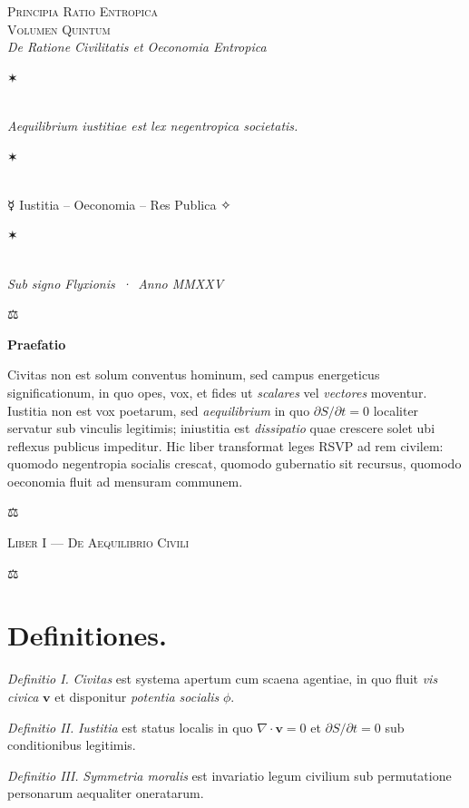\documentclass[12pt]{article}
\newcommand{\justitia}{\centerline{\Large ⚖}}
\newcommand{\aster}{\centerline{✶}}
\newcommand{\divider}{\vspace{1em}\justitia\vspace{1em}}
\newcommand{\Liber}[1]{\vspace{1ex}\begin{center}\Large\textsc{Liber #1}\end{center}\vspace{-0.5ex}\justitia\vspace{0.5ex}}
\begin{document}
\begin{center}
{\Large \textsc{Principia Ratio Entropica}}\\[-0.25ex]
{\small \textsc{Volumen Quintum}}\\[0.5ex]
{\itshape De Ratione Civilitatis et Oeconomia Entropica}\\[1.25em]
\aster\\[0.5em]
{\itshape Aequilibrium iustitiae est lex negentropica societatis.}\\[0.5em]
\aster\\[0.75em]
{\large ☿\; Iustitia \;--\; Oeconomia \;--\; Res Publica \;✧}\\[0.75em]
\aster\\[0.25em]
{\itshape Sub signo Flyxionis \,·\, Anno MMXXV}
\end{center}

\divider

\begin{center}\textbf{Praefatio}\end{center}

Civitas non est solum conventus hominum, sed campus energeticus significationum, in quo opes, vox, et fides ut \textit{scalares} vel \textit{vectores} moventur. Iustitia non est vox poetarum, sed \textit{aequilibrium} in quo \(\partial S/\partial t = 0\) localiter servatur sub vinculis legitimis; iniustitia est \textit{dissipatio} quae crescere solet ubi reflexus publicus impeditur. Hic liber transformat leges RSVP ad rem civilem: quomodo negentropia socialis crescat, quomodo gubernatio sit recursus, quomodo oeconomia fluit ad mensuram communem.

\divider

\Liber{I — De Aequilibrio Civili}

\section*{Definitiones.}

\textit{Definitio I.} \; \textit{Civitas} est systema apertum cum scaena agentiae, in quo fluit \textit{vis civica} \(\mathbf{v}\) et disponitur \textit{potentia socialis} \(\phi\).

\textit{Definitio II.} \; \textit{Iustitia} est status localis in quo \(\nabla\cdot \mathbf{v}=0\) et \(\partial S/\partial t=0\) sub conditionibus legitimis.

\textit{Definitio III.} \; \textit{Symmetria moralis} est invariatio legum civilium sub permutatione personarum aequaliter oneratarum.
\end{document}
